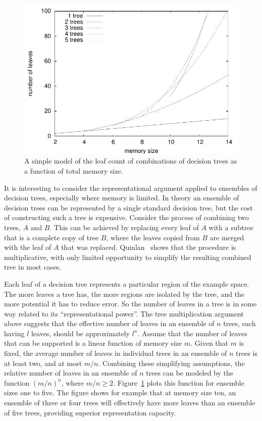 \begin{figure}
\includegraphics{figures/multitreereppower2}
\caption{A simple model of the leaf count of combinations of decision trees as a function of total memory size.}
\label{fig:multitreereppower}
\end{figure}

It is interesting to consider the representational argument applied to ensembles of decision trees, especially where memory is limited. In theory an ensemble of decision trees can be represented by a single standard decision tree, but the cost of constructing such a tree is expensive. Consider the process of combining two trees, $A$ and $B$. This can be achieved by replacing every leaf of $A$ with a subtree that is a complete copy of tree $B$, where the leaves copied from $B$ are merged with the leaf of $A$ that was replaced. Quinlan~\cite{miniboost} shows that the procedure is multiplicative, with only limited opportunity to simplify the resulting combined tree in most cases. 

Each leaf of a decision tree represents a particular region of the example space. The more leaves a tree has, the more regions are isolated by the tree, and the more potential it has to reduce error. So the number of leaves in a tree is in some way related to its ``representational power''. The tree multiplication argument above suggests that the effective number of leaves in an ensemble of $n$ trees, each having $l$ leaves, should be approximately $l^n$. 
Assume that the number of leaves that can be supported is a linear function of memory size $m$. Given that $m$ is fixed, the average number of leaves in individual trees in an ensemble of $n$ trees is at least two, and at most $m/n$. Combining these simplifying assumptions, the relative number of leaves in an ensemble of $n$ trees can be modeled by the function $(m/n)^n$, where $m/n \ge 2$. Figure~\ref{fig:multitreereppower} plots this function for ensemble sizes one to five. The figure shows for example that at memory size ten, an ensemble of three or four trees will effectively have more leaves than an ensemble of five trees, providing superior representation capacity.

